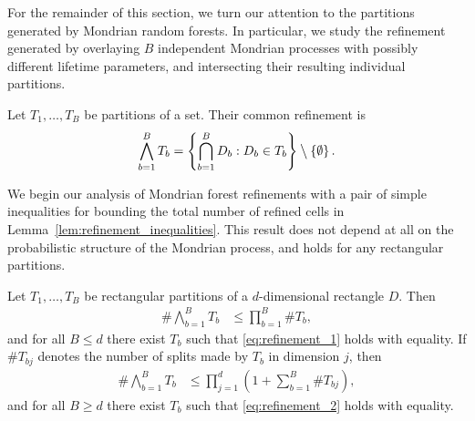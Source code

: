 For the remainder of this section, we turn our attention to the partitions
generated by Mondrian random forests. In particular, we study the refinement
generated by overlaying $B$ independent Mondrian processes with possibly
different lifetime parameters, and intersecting their resulting individual
partitions.


\begin{definition}%
  \label{def:mondrian_refinement}

  Let $T_1, \ldots, T_B$ be partitions of a set.
  Their common refinement is
  \begin{align*}
    \bigwedge_{b=1}^B T_b
    = \left\{
      \bigcap_{b=1}^B D_b:
      D_b \in T_b
    \right\}
    \mathbin{\big\backslash}
    \left\{ \emptyset \right\}.
  \end{align*}
\end{definition}

We begin our analysis of Mondrian forest refinements with a pair of simple
inequalities for bounding the total number of refined cells
in Lemma~\ref{lem:refinement_inequalities}. This result does not depend at all
on the probabilistic structure of the Mondrian process, and holds for any
rectangular partitions.

\begin{lemma}
  \label{lem:refinement_inequalities}

  Let $T_1, \ldots, T_B$ be rectangular partitions of a $d$-dimensional
  rectangle $D$. Then
  \begin{align}
    \label{eq:refinement_1}
    \# \bigwedge_{b=1}^B T_b
    &\leq \prod_{b=1}^B \# T_b,
  \end{align}
  and for all $B \leq d$ there exist $T_b$ such that
  \eqref{eq:refinement_1} holds with equality.
  If $\# T_{b j}$ denotes the number of splits
  made by $T_b$ in dimension $j$, then
  \begin{align}
    \label{eq:refinement_2}
    \# \bigwedge_{b=1}^B T_b
    &\leq \prod_{j=1}^d
    \left( 1 + \sum_{b=1}^B \# T_{b j} \right),
  \end{align}
  and for all $B \geq d$ there exist $T_b$ such that
  \eqref{eq:refinement_2} holds with equality.

\end{lemma}

